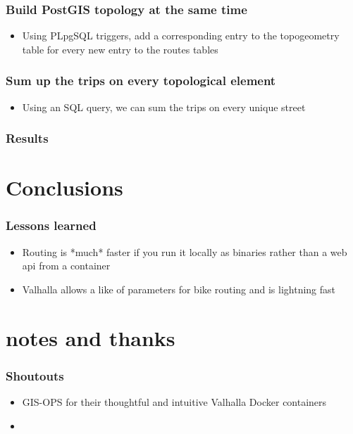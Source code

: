\documentclass{beamer}
\begin{document}
\begin{frame}
    \frametitle{Build PostGIS topology at the same time}
    \begin{itemize}
        \item Using PLpgSQL triggers, add a corresponding entry to the topogeometry table for every new entry to the routes tables
    \end{itemize}
\end{frame}

\begin{frame}
    \frametitle{Sum up the trips on every topological element}

    \begin{itemize}
        \item Using an SQL query, we can sum the trips on every unique street
    \end{itemize}

\end{frame}

\begin{frame}
    \frametitle{Results}

    

    

\end{frame}
\section{Conclusions}
\begin{frame}
    \frametitle{Lessons learned}

    \begin{itemize}
        \item Routing is *much* faster if you run it locally as binaries rather than a web api from a container
        \item Valhalla allows a like of parameters for bike routing and is lightning fast
    \end{itemize}



\end{frame}
\section{notes and thanks}
\begin{frame}
    \frametitle{Shoutouts}

    \begin{itemize}
        \item GIS-OPS for their thoughtful and intuitive Valhalla Docker containers
        \item
    \end{itemize}



\end{frame}
\end{document}
